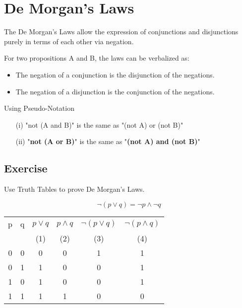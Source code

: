 \documentclass[12pt]{article} %
\begin{document}
	\Large
\section*{De Morgan's Laws}
The De Morgan's Laws allow the expression of conjunctions and disjunctions purely in terms of each other via negation.
\bigskip

\noindent For two propositions A and B, the laws can be verbalized as:
\begin{itemize}
\item The negation of a conjunction is the disjunction of the negations.
\item The negation of a disjunction is the conjunction of the negations.
\end{itemize}

\begin{framed}
\noindent Using Pseudo-Notation
\begin{itemize}
	\item[(i)]"not (A and B)" is the same as "(not A) or (not B)"
	
	\item[(ii)] "\textbf{not (A or B)}" is the same as "\textbf{(not A) and (not B)}"
\end{itemize}
\end{framed}
\newpage

\subsection{Exercise }Use Truth Tables to prove De Morgan's Laws.
{
	\LARGE
\[  \neg (p \vee q) = \neg p \wedge \neg q\]

}
{
	
\Large
\begin{center}
\begin{tabular}{|c|c||c|c|c|c|}
  \hline
p	&	q	&	$ p \vee q$	&	$ p \wedge q$&	$\neg (p \vee q)$	&	$\neg (p \wedge q)$\\
	&		&	(1)	&	(2)	&	(3)	&	(4)	\\ \hline
\phantom{sp}0\phantom{sp}	&	\phantom{sp}0\phantom{sp}	&	\phantom{sp}0\phantom{sp}	&	\phantom{sp}0\phantom{sp}	&	1	&	1 \\
0	&	1	&	1	&	0	&	0	&	1\\
1	&	0	&	1	&	0	&	0	&	1\\
1	&	1	&	1	&	1	&	\phantom{sp}0\phantom{sp}	&	\phantom{sp}0\phantom{sp}\\
  \hline
\end{tabular}
\end{center}
}
\newpage
\end{document}
